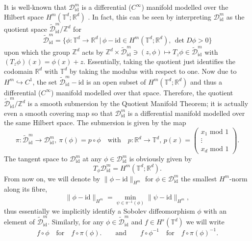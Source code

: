 \documentclass[a4paper, 12pt]{article}
\newcommand{\R}{\mathbb{R}}
\newcommand{\T}{\mathbb{T}}
\newcommand{\Z}{\mathbb{Z}}
\newcommand{\id}{\mathrm{id}}
\newcommand{\DiffSobId}{\mathcal D_{\id}}
\newcommand{\DiffSobIdLift}{\widetilde{\mathcal D}_{\id}}
\begin{document}
It is well-known that $\DiffSobId^m$ is a differential ($C^\infty$) manifold modelled over the Hilbert space $H^m(\T^d;\R^d)$ \cite{MiPr10}.
In fact, this can be seen by interpreting $\DiffSobId^m$ as the quotient space $\DiffSobIdLift^m/\Z^d$ for
\begin{equation*}
\DiffSobIdLift^m=\{\phi:\T^d\to\R^d\,|\,\phi-\id\in H^m(\T^d;\R^d),\,\det D\phi>0\}
\end{equation*}
upon which the group $\Z^d$ acts by $\Z^d\times\DiffSobIdLift^m\ni(z,\phi)\mapsto T_z\phi\in\DiffSobIdLift^m$ with $(T_z\phi)(x)=\phi(x)+z$.
Essentially, taking the quotient just identifies the codomain $\R^d$ with $\T^d$ by taking the modulus with respect to one.
Now due to $H^m\hookrightarrow C^1$, the set $\DiffSobIdLift^m-\id$ is an open subset of $H^m(\T^d;\R^d)$ and thus a differential ($C^\infty$) manifold modelled over that space.
Therefore, the quotient $\DiffSobIdLift^m/\Z^d$ is a smooth submersion by the Quotient Manifold Theorem;
it is actually even a smooth covering map \cite[Thm.\,9.19]{Le03} so that $\DiffSobId^m$ is a differential manifold modelled over the same Hilbert space.
The submersion is given by the map
\begin{equation*}
\pi:\DiffSobIdLift^m\to\DiffSobId^m,\
\pi(\phi)=p\circ\phi
\quad\text{with}\quad
p:\R^d\to\T^d,\,p(x)=\left(\begin{smallmatrix}x_1\text{ mod }1\\\vdots\\x_d\text{ mod }1\end{smallmatrix}\right).
\end{equation*}
The tangent space to $\DiffSobId^m$ at any $\phi\in\DiffSobId^m$ is obviously given by
\begin{equation*}
T_\phi\DiffSobId^m=H^m(\T^d;\R^d).
\end{equation*}
From now on, we will denote by $\|\phi-\id\|_{H^m}$ for $\phi\in\DiffSobId^m$ the smallest $H^m$-norm along its fibre,
\begin{equation*}
\|\phi-\id\|_{H^m}=\min_{\psi\in\pi^{-1}(\phi)}\|\psi-\id\|_{H^m},
\end{equation*}
thus essentially we implicitly identify a Sobolev diffeomorphism $\phi$ with an element of $\DiffSobIdLift^m$.
Similarly, for any $\phi\in\DiffSobIdLift^m$ and $f\in H^s(\T^d)$ we will write
\begin{equation*}
f\circ\phi
\quad\text{for}\quad
f\circ \pi(\phi).
\qquad\text{and}\qquad
f\circ\phi^{-1}
\quad\text{for}\quad
f\circ \pi(\phi)^{-1}.
\end{equation*}
\end{document}
